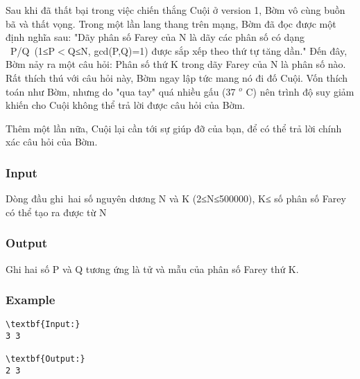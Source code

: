 



   Sau khi đã thất bại trong việc chiến thắng Cuội ở version 1, Bờm vô cùng buồn bã và thất vọng. Trong một lần lang thang trên mạng, Bờm đã đọc được một định nghĩa sau: "Dãy phân số Farey của N là dãy các phân số có dạng  P/Q (1≤P$<$Q≤N, gcd(P,Q)=1) được sắp xếp theo thứ tự tăng dần." Đến đây, Bờm nảy ra một câu hỏi: Phân số thứ K trong dãy Farey của N là phân số nào.  Rất thích thú với câu hỏi này, Bờm ngay lập tức mang nó đi đố Cuội. Vốn thích toán như Bờm, nhưng do "qua tay" quá nhiều gấu (37   $^    o   $   C) nên trình độ suy giảm khiến cho Cuội không thể trả lời được câu hỏi của Bờm.  

   Thêm một lần nữa, Cuội lại cần tới sự giúp đỡ của bạn, để có thể trả lời chính xác câu hỏi của Bờm.  

\subsubsection{   Input  }

   Dòng đầu ghi hai số nguyên dương N và K (2≤N≤500000), K≤ số phân số Farey có thể tạo ra được từ N  

\subsubsection{   Output  }

   Ghi hai số P và Q tương ứng là tử và mẫu của phân số Farey thứ K.  

\subsubsection{   Example  }
\begin{verbatim}
\textbf{Input:}
3 3

\textbf{Output:}
2 3\end{verbatim}